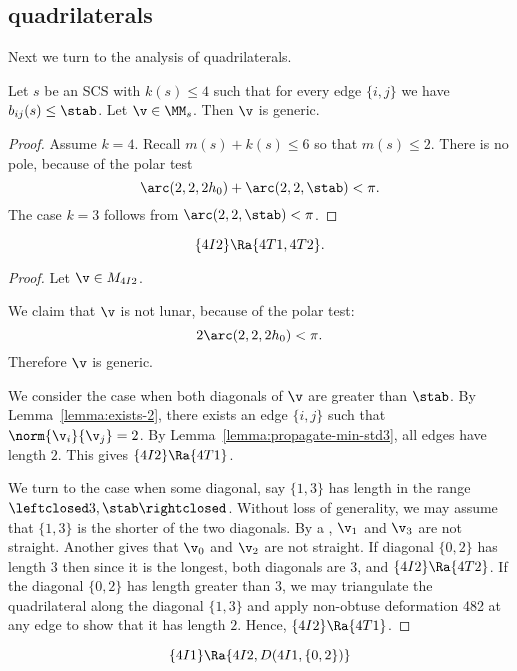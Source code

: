 \subsection{quadrilaterals}

Next we turn to the analysis of quadrilaterals.

\begin{lemma}[]
Let $s$ be an SCS with $k(s)\le 4$ such that for every edge $\{i,j\}$ we have $b_{ij}(s)\le\stab$.
Let $\v\in \MM_s$.  Then $\v$ is generic.
\end{lemma}

\begin{proof}
Assume $k=4$.
Recall $m(s) + k(s) \le 6$ so that $m(s)\le 2$.
There is no pole, because of the polar test
\[
\arc(2,2,2h_0) + \arc(2,2,\stab) < \pi.
\]
The case $k=3$ follows from $\arc(2,2,\stab)<\pi$.
\end{proof}


\begin{lemma}[]
\[
\{4I2\}\Ra \{4T1,4T2\}.
\]
\end{lemma}

\begin{proof}
Let $\v\in M_{4I2}$.

We claim that $\v$ is not lunar, because of the polar test:
\[
2 \arc(2,2,2h_0) < \pi.
\]
Therefore $\v$ is generic.

We consider the case when both diagonals of $\v$ are greater than $\stab$.
By Lemma~\ref{lemma:exists-2}, there exists an edge $\{i,j\}$ such that $\norm{\v_i}{\v_j}=2$.
By Lemma~\ref{lemma:propagate-min-std3}, all edges have length $2$.  This gives $\{4I2\}\Ra\{4T1\}$.

We turn to the case when some diagonal, say $\{1,3\}$ has length in the range $\leftclosed 3,\stab\rightclosed$.
Without loss of generality, we may assume that $\{1,3\}$ is the shorter of the two diagonals.
By a , $\v_1$ and $\v_3$ are not straight.  Another  gives that $\v_0$ and $\v_2$
are not straight.
If diagonal $\{0,2\}$ has length $3$ then since it is the longest, both diagonals are $3$, and $\{4I2\}\Ra\{4T2\}$.
If the diagonal $\{0,2\}$ has length greater than $3$, we may triangulate the quadrilateral along the diagonal
$\{1,3\}$ and apply non-obtuse deformation 482 at any edge to show that it has length $2$.  Hence,
$\{4I2\}\Ra\{4T1\}$.
\end{proof}

\begin{lemma}[]
\[
\{4I1\}\Ra \{4I2,D(4I1,\{0,2\})\}
\]
\end{lemma}

